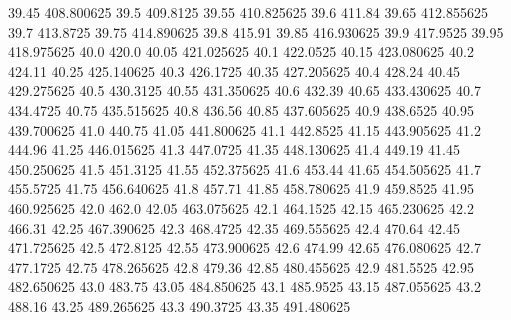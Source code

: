           39.45       408.800625
           39.5         409.8125
          39.55       410.825625
           39.6           411.84
          39.65       412.855625
           39.7         413.8725
          39.75       414.890625
           39.8           415.91
          39.85       416.930625
           39.9         417.9525
          39.95       418.975625
           40.0            420.0
          40.05       421.025625
           40.1         422.0525
          40.15       423.080625
           40.2           424.11
          40.25       425.140625
           40.3         426.1725
          40.35       427.205625
           40.4           428.24
          40.45       429.275625
           40.5         430.3125
          40.55       431.350625
           40.6           432.39
          40.65       433.430625
           40.7         434.4725
          40.75       435.515625
           40.8           436.56
          40.85       437.605625
           40.9         438.6525
          40.95       439.700625
           41.0           440.75
          41.05       441.800625
           41.1         442.8525
          41.15       443.905625
           41.2           444.96
          41.25       446.015625
           41.3         447.0725
          41.35       448.130625
           41.4           449.19
          41.45       450.250625
           41.5         451.3125
          41.55       452.375625
           41.6           453.44
          41.65       454.505625
           41.7         455.5725
          41.75       456.640625
           41.8           457.71
          41.85       458.780625
           41.9         459.8525
          41.95       460.925625
           42.0            462.0
          42.05       463.075625
           42.1         464.1525
          42.15       465.230625
           42.2           466.31
          42.25       467.390625
           42.3         468.4725
          42.35       469.555625
           42.4           470.64
          42.45       471.725625
           42.5         472.8125
          42.55       473.900625
           42.6           474.99
          42.65       476.080625
           42.7         477.1725
          42.75       478.265625
           42.8           479.36
          42.85       480.455625
           42.9         481.5525
          42.95       482.650625
           43.0           483.75
          43.05       484.850625
           43.1         485.9525
          43.15       487.055625
           43.2           488.16
          43.25       489.265625
           43.3         490.3725
          43.35       491.480625
